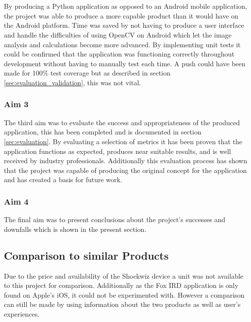 			\\\\
			By producing a Python application as opposed to an Android mobile application, the project was able to produce a more capable product than it would have on the Android platform. Time was saved by not having to produce a user interface and handle the difficulties of using OpenCV on Android which let the image analysis and calculations become more advanced. By implementing unit tests it could be confirmed that the application was functioning correctly throughout development without having to manually test each time. A push could have been made for 100\% test coverage but as described in section \ref{sec:evaluation_validation}, this was not vital.
		\subsubsection{Aim 3}
			The third aim was to evaluate the success and appropriateness of the produced application, this has been completed and is documented in section \ref{sec:evaluation}. By evaluating a selection of metrics it has been proven that the application functions as expected, produces near suitable results, and is well received by industry professionals. Additionally this evaluation process has shown that the project was capable of producing the original concept for the application and has created a basis for future work.
		\subsubsection{Aim 4}
			The final aim was to present conclusions about the project's successes and downfalls which is shown in the present section.
	\subsection{Comparison to similar Products}
		Due to the price and availability of the Shockwiz device a unit was not available to this project for comparison. Additionally as the Fox IRD application is only found on Apple's iOS, it could not be experimented with. However a comparison can still be made by using information about the two products as well as user's experiences.
